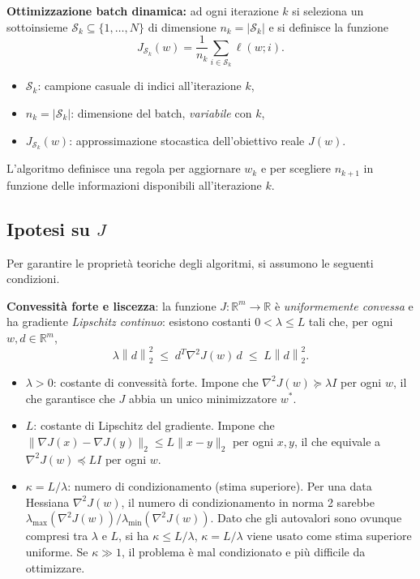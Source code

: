 \documentclass[a4paper,12pt]{article}
\numberwithin{equation}{section}
\numberwithin{figure}{section}
\numberwithin{table}{section}
\newcommand{\R}{\mathbb{R}}
\newcommand{\norm}[1]{\left\|#1\right\|}
\begin{document}
\begin{definitionbox}
  \textbf{Ottimizzazione batch dinamica:} ad ogni iterazione $k$ si seleziona un sottoinsieme $\mathcal{S}_k \subseteq \{1,\dots,N\}$ di dimensione $n_k = |\mathcal{S}_k|$ e si definisce la funzione
  \[
    J_{\mathcal{S}_k}(w) = \frac{1}{n_k} \sum_{i \in \mathcal{S}_k} \ell(w;i).
  \]
  \begin{itemize}
    \item $\mathcal{S}_k$: campione casuale di indici all'iterazione $k$,
    \item $n_k = |\mathcal{S}_k|$: dimensione del batch, \emph{variabile} con $k$,
    \item $J_{\mathcal{S}_k}(w)$: approssimazione stocastica dell'obiettivo reale $J(w)$.
  \end{itemize}
  L'algoritmo definisce una regola per aggiornare $w_k$ e per scegliere $n_{k+1}$ in funzione delle informazioni disponibili all'iterazione $k$.
\end{definitionbox}

\subsection{Ipotesi su $J$}

Per garantire le propriet\`a teoriche degli algoritmi, si assumono le seguenti condizioni.

\begin{definitionbox}
  \textbf{Convessit\`a forte e liscezza}: la funzione $J: \R^m \to \R$ \`e \emph{uniformemente convessa} e ha gradiente \emph{Lipschitz continuo}: esistono costanti $0 < \lambda \leq L$ tali che, per ogni $w, d \in \R^m$,
  \[
    \lambda \norm{d}_2^2 \;\leq\; d^T \nabla^2 J(w)\, d \;\leq\; L \norm{d}_2^2.
  \]
  \begin{itemize}
    \item $\lambda > 0$: costante di convessità forte. Impone che $\nabla^2 J(w) \succeq \lambda I$ per ogni $w$, il che garantisce che $J$ abbia un unico minimizzatore $w^*$.
    \item $L$: costante di Lipschitz del gradiente. Impone che $\|\nabla J(x) - \nabla J(y)\|_2 \leq L\|x - y\|_2$ per ogni $x,y$, il che equivale a $\nabla^2 J(w) \preceq LI$ per ogni $w$.
    \item $\kappa = L/\lambda$: numero di condizionamento (stima superiore). Per una data Hessiana $\nabla^2 J(w)$, il numero di condizionamento in norma 2 sarebbe $\lambda_{\max}(\nabla^2 J(w))/\lambda_{\min}(\nabla^2 J(w))$. Dato che gli autovalori sono ovunque compresi tra $\lambda$ e $L$, si ha $\kappa \leq L/\lambda$, $\kappa = L/\lambda$ viene usato come stima superiore uniforme. Se $\kappa \gg 1$, il problema è mal condizionato e più difficile da ottimizzare.
\end{itemize}
  

  
\end{definitionbox}
\end{document}

